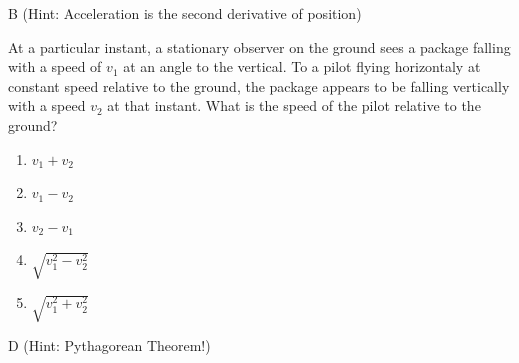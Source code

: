 \begin{solution}
B (Hint: Acceleration is the second derivative of position)
\end{solution}


\begin{question}
At a particular instant, a stationary observer on the ground sees a package falling with a speed of $v_1$ at an angle to the vertical. To a pilot flying horizontaly at constant speed relative to the ground, the package appears to be falling vertically with a speed $v_2$ at that instant. What is the speed of the pilot relative to the ground?

\begin{multicols}{5}
\begin{enumerate}
    \item $v_1+v_2$
    \item $v_1-v_2$
    \item $v_2-v_1$
    \item $\sqrt{v_1^2-v_2^2}$
    \item $\sqrt{v_1^2+v_2^2}$
\end{enumerate}
\end{multicols}
\end{question}

\begin{solution}
D (Hint: Pythagorean Theorem!)
\end{solution}

